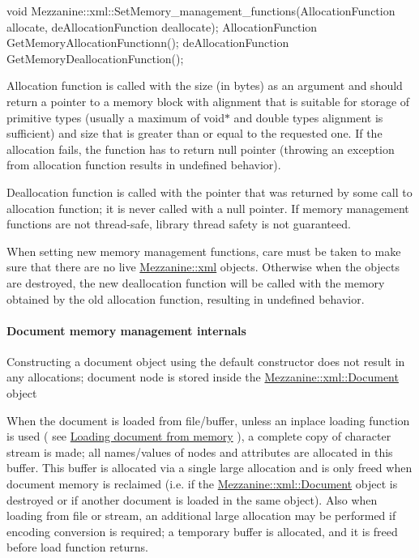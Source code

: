 \begin{DoxyCode}
 void Mezzanine::xml::SetMemory_management_functions(AllocationFunction allocate,
       deAllocationFunction deallocate);
 AllocationFunction GetMemoryAllocationFunctionn();
 deAllocationFunction GetMemoryDeallocationFunction();
\end{DoxyCode}
 Allocation function is called with the size (in bytes) as an argument and should return a pointer to a memory block with alignment that is suitable for storage of primitive types (usually a maximum of void$\ast$ and double types alignment is sufficient) and size that is greater than or equal to the requested one. If the allocation fails, the function has to return null pointer (throwing an exception from allocation function results in undefined behavior). \par
 \par
 Deallocation function is called with the pointer that was returned by some call to allocation function; it is never called with a null pointer. If memory management functions are not thread-\/safe, library thread safety is not guaranteed. \par
 \par
 When setting new memory management functions, care must be taken to make sure that there are no live \hyperlink{namespaceMezzanine_1_1xml}{Mezzanine::xml} objects. Otherwise when the objects are destroyed, the new deallocation function will be called with the memory obtained by the old allocation function, resulting in undefined behavior. \par
 \par
 \hypertarget{XMLManual_XMLMemoryInternals}{}\paragraph{Document memory management internals}\label{XMLManual_XMLMemoryInternals}
Constructing a document object using the default constructor does not result in any allocations; document node is stored inside the \hyperlink{classMezzanine_1_1xml_1_1Document}{Mezzanine::xml::Document} object \par
 \par
 When the document is loaded from file/buffer, unless an inplace loading function is used ( see \hyperlink{XMLManual_XMLLoadingFromMemory}{Loading document from memory} ), a complete copy of character stream is made; all names/values of nodes and attributes are allocated in this buffer. This buffer is allocated via a single large allocation and is only freed when document memory is reclaimed (i.e. if the \hyperlink{classMezzanine_1_1xml_1_1Document}{Mezzanine::xml::Document} object is destroyed or if another document is loaded in the same object). Also when loading from file or stream, an additional large allocation may be performed if encoding conversion is required; a temporary buffer is allocated, and it is freed before load function returns. \par
